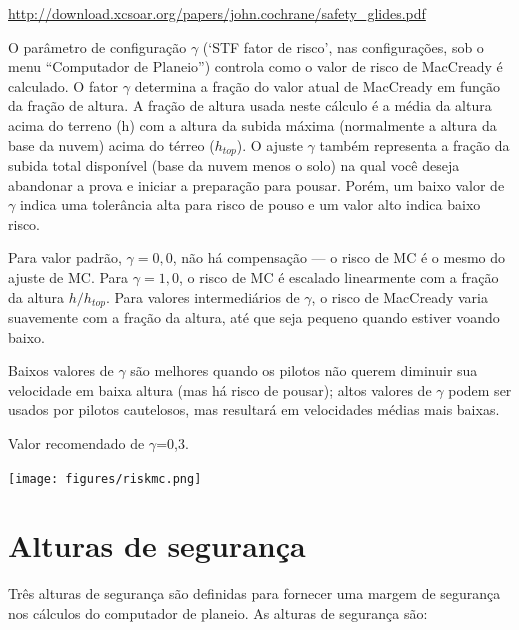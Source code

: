 \url{http://download.xcsoar.org/papers/john.cochrane/safety_glides.pdf}

O parâmetro de configuração $\gamma$ (‘STF fator de risco’, nas configurações, sob o menu “Computador de Planeio”) controla como o valor de risco de MacCready é calculado.  O fator $\gamma$ determina a fração do valor atual de MacCready em função da fração de altura.  A fração de altura usada neste cálculo é a média da altura acima do terreno (h) com a altura da subida máxima (normalmente a altura da base da nuvem) acima do térreo  ($h_{top}$).  O ajuste $\gamma$ também representa a fração da subida total disponível (base da nuvem menos o solo) na qual você deseja abandonar a prova e iniciar a preparação para pousar.  Porém, um baixo valor de $\gamma$ indica uma tolerância alta para risco de pouso e um valor alto indica baixo risco.

  Para valor padrão, $\gamma=0,0$, não há compensação ---
o risco de MC é o mesmo do ajuste de MC.  Para $\gamma=1,0$,  o risco de MC é escalado linearmente com a fração da altura $h/h_{top}$.
  Para valores intermediários de $\gamma$, o risco de MacCready varia suavemente com a fração da altura, até que seja pequeno quando estiver voando baixo.

 Baixos valores de $\gamma$ são melhores quando os pilotos não querem diminuir sua velocidade em baixa altura (mas há risco de pousar);  altos valores de $\gamma$ podem ser usados por pilotos cautelosos, mas resultará em velocidades médias mais baixas.

  Valor recomendado de  $\gamma$=0,3.

\begin{center}
\texttt{[image: figures/riskmc.png]}
\end{center}


\section{Alturas de segurança}\label{sec:safety-heights}

Três alturas de segurança são definidas para fornecer uma margem de segurança nos cálculos do computador de planeio.  
As alturas de segurança são:

